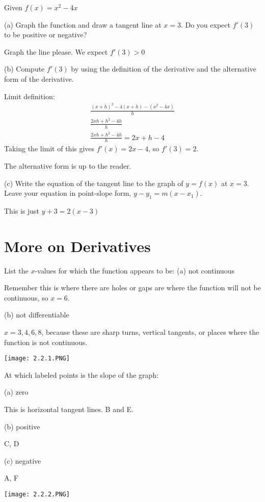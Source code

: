 \documentclass[../bccalc.tex]{subfiles}
\begin{document}
\begin{example}
    Given $f(x)=x^2-4x$

    (a) Graph the function and draw a tangent line at $x=3$. Do you expect $f'(3)$ to be positive or negative?

    Graph the line please. We expect $f'(3)>0$

    (b) Compute $f'(3)$ by using the definition of the derivative and the alternative form of the derivative.

    Limit definition: 
    \begin{align*}
        \frac{(x+h)^2-4(x+h)-(x^2-4x)}{h} \\
        \frac{2xh+h^2-4h}{h}\\
        \frac{2xh+h^2-4h}{h} = 2x+h-4
    \end{align*}
    Taking the limit of this gives $f'(x)=2x-4$, so $f'(3)=2$.

    The alternative form is up to the reader.

    (c) Write the equation of the tangent line to the graph of $y=f(x)$ at $x=3$. Leave your equation in point-slope form, $y-y_1=m(x-x_1)$.

    This is just $y+3=2(x-3)$
\end{example}

\pagebreak
\section{More on Derivatives}
\begin{example}
    List the $x$-values for which the function appears to be:
    (a) not continuous 

    Remember this is where there are holes or gaps are where the function will not be continuous, so $x=6$.

    (b) not differentiable 

    $x=3,4,6,8$, because these are sharp turns, vertical tangents, or places where the function is not continuous.
    \begin{center}
        \texttt{[image: 2.2.1.PNG]}
    \end{center}
\end{example}

\begin{example}
    At which labeled points is the slope of the graph:

    (a) zero 

    This is horizontal tangent lines. B and E.

    (b) positive 

    C, D

    (c) negative 

    A, F

    \begin{center}
        \texttt{[image: 2.2.2.PNG]}
    \end{center}
\end{example}
\end{document}
